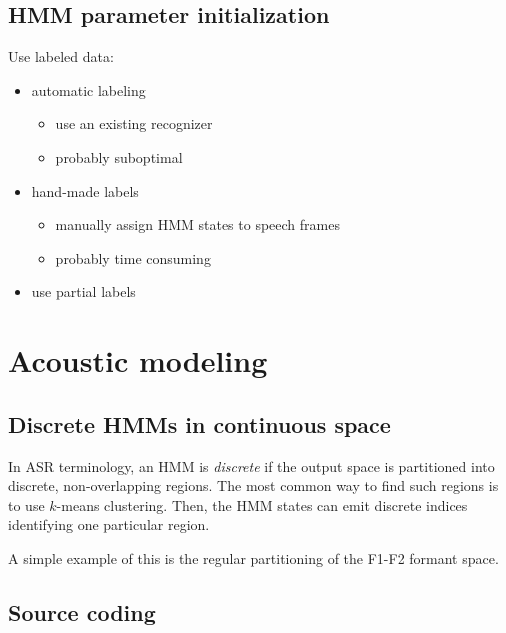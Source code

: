 \documentclass[11pt]{article}
\begin{document}
\subsection{HMM parameter initialization}

Use labeled data:
\begin{itemize}
    \item automatic labeling
        \begin{itemize}
            \item use an existing recognizer
            \item probably suboptimal
        \end{itemize}
    \item hand-made labels
        \begin{itemize}
            \item manually assign HMM states to speech frames
            \item probably time consuming
        \end{itemize}
    \item use partial labels
\end{itemize}

\section{Acoustic modeling}

\subsection{Discrete HMMs in continuous space}

In ASR terminology, an HMM is \textit{discrete} if the output space is partitioned into discrete, non-overlapping regions. The most common way to find such regions is to use $k$-means clustering. Then, the HMM states can emit discrete indices identifying one particular region.

A simple example of this is the regular partitioning of the F1-F2 formant space.

\subsection{Source coding}
\end{document}
